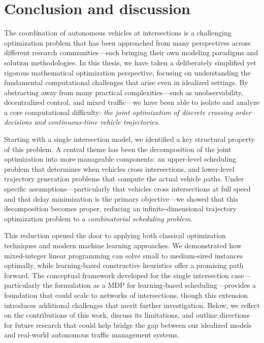 \documentclass[a4paper]{report}
\theoremstyle{definition}
\theoremstyle{plain}
\begin{document}
\chapter{Conclusion and discussion}\label{chap:conclusion}

The coordination of autonomous vehicles at intersections is a challenging
optimization problem that has been approached from many perspectives across
different research communities---each bringing their own modeling paradigms and
solution methodologies.
%
In this thesis, we have taken a deliberately simplified yet rigorous
mathematical optimization perspective, focusing on understanding the fundamental
computational challenges that arise even in idealized settings.
%
By abstracting away from many practical complexities---such as unobservability,
decentralized control, and mixed traffic---we have been able to isolate and
analyze a core computational difficulty: \emph{the joint optimization of discrete
crossing order decisions and continuous-time vehicle trajectories}.

Starting with a single intersection model, we identified a key structural
property of this problem.
%
A central theme has been the decomposition of the joint optimization into more
manageable components: an upper-level scheduling problem that determines when
vehicles cross intersections, and lower-level trajectory generation problems
that compute the actual vehicle paths.
%
Under specific assumptions---particularly that vehicles cross intersections at
full speed and that delay minimization is the primary objective---we showed that
this decomposition becomes proper, reducing an infinite-dimensional trajectory
optimization problem to a \emph{combinatorial scheduling problem}.

This reduction opened the door to applying both classical optimization
techniques and modern machine learning approaches.
%
We demonstrated how mixed-integer linear programming can solve small to
medium-sized instances optimally, while learning-based constructive heuristics
offer a promising path forward.
%
The conceptual framework developed for the single intersection
case---particularly the formulation as a MDP for learning-based
scheduling---provides a foundation that could scale to networks of
intersections, though this extension introduces additional challenges that merit
further investigation.
%
Below, we reflect on the contributions of this work, discuss its limitations,
and outline directions for future research that could help bridge the gap
between our idealized models and real-world autonomous traffic management
systems.
\end{document}
